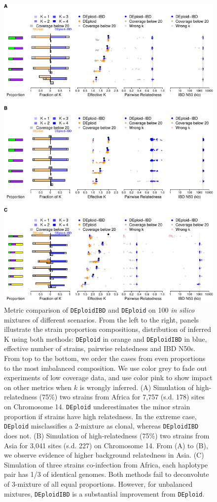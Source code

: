 \documentclass[9pt,lineno]{elife}
\begin{document}
\begin{figure}[htp]
  \begin{center}
  \includegraphics[width=.9\textwidth]{Fig2.pdf}
  \caption{Metric comparison of \texttt{DEploidIBD} and \texttt{DEploid} on 100 {\it in silico} mixtures of different scenarios. From the left to the right, panels illustrate the strain proportion compositions, distribution of inferred K using both methods: {\tt DEploid} in orange and {\tt DEploidIBD} in blue, effective number of strains, pairwise relatedness and IBD N50s. From top to the bottom, we order the cases from even proportions to the most imbalanced composition. We use color grey to fade out experiments of low coverage data, and use color pink to show impact on other metrics when $k$ is wrongly inferred.
  (A) Simulation of high-relatedness (75\%) two strains from Africa for 7,757 (s.d. 178) sites on Chromosome 14. {\tt DEploid} underestimates the minor strain proportion if strains have high relatedness. In the extreme case, {\tt DEploid} misclassifies a $2$-mixture as clonal, whereas {\tt DEploidIBD} does not.
  (B) Simulation of high-relatedness (75\%) two strains from Asia for 3,041 sites (s.d. 227) on Chromosome 14.
  From (A) to (B), we observe evidence of higher background relatedness in Asia.
  (C) Simulation of three strains co-infection from Africa, each haplotype pair has 1/3 of identical genomes. Both methods fail to deconvolute of 3-mixture of all equal proportions. However, for unbalanced mixtures, {\tt DEploidIBD} is a substantial improvement from {\tt DEploid}.
  }\label{fig:benchmark}
  \end{center}

\setcounter{fig2Counter}{\value{enumi}}
\end{figure}
\end{document}
